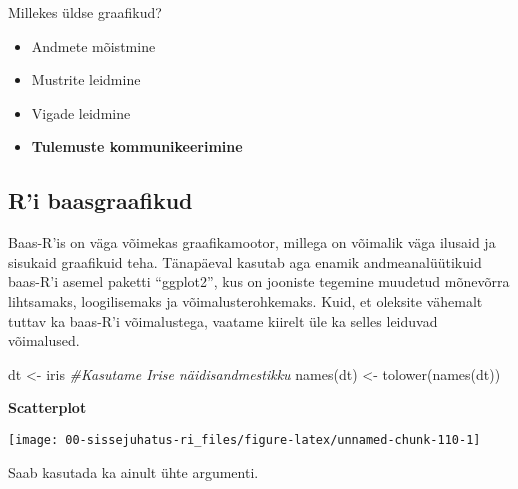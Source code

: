 \documentclass[
]{book}
\newenvironment{Shaded}{\begin{snugshade}}{\end{snugshade}}
\newcommand{\AttributeTok}[1]{\textcolor[rgb]{0.77,0.63,0.00}{#1}}
\newcommand{\CommentTok}[1]{\textcolor[rgb]{0.56,0.35,0.01}{\textit{#1}}}
\newcommand{\FunctionTok}[1]{\textcolor[rgb]{0.00,0.00,0.00}{#1}}
\newcommand{\NormalTok}[1]{#1}
\newcommand{\OtherTok}[1]{\textcolor[rgb]{0.56,0.35,0.01}{#1}}
\newcommand{\SpecialCharTok}[1]{\textcolor[rgb]{0.00,0.00,0.00}{#1}}
\providecommand{\tightlist}{%
  \setlength{\itemsep}{0pt}\setlength{\parskip}{0pt}}
\begin{document}
Millekes üldse graafikud?

\begin{itemize}
\tightlist
\item
  Andmete mõistmine
\item
  Mustrite leidmine
\item
  Vigade leidmine
\item
  \textbf{Tulemuste kommunikeerimine}
\end{itemize}

\hypertarget{ri-baasgraafikud}{%
\subsection{R'i baasgraafikud}\label{ri-baasgraafikud}}

Baas-R'is on väga võimekas graafikamootor, millega on võimalik väga ilusaid ja sisukaid graafikuid teha. Tänapäeval kasutab aga enamik andmeanalüütikuid baas-R'i asemel paketti ``ggplot2'', kus on jooniste tegemine muudetud mõnevõrra lihtsamaks, loogilisemaks ja võimalusterohkemaks. Kuid, et oleksite vähemalt tuttav ka baas-R'i võimalustega, vaatame kiirelt üle ka selles leiduvad võimalused.

\begin{Shaded}
\begin{Highlighting}[]
\NormalTok{dt }\OtherTok{\textless{}{-}}\NormalTok{ iris }\CommentTok{\#Kasutame Iris\textquotesingle{}e näidisandmestikku}
\FunctionTok{names}\NormalTok{(dt) }\OtherTok{\textless{}{-}} \FunctionTok{tolower}\NormalTok{(}\FunctionTok{names}\NormalTok{(dt))}
\end{Highlighting}
\end{Shaded}

\textbf{Scatterplot}

\begin{Shaded}
\end{Shaded}

\begin{center}\texttt{[image: 00-sissejuhatus-ri\_files/figure-latex/unnamed-chunk-110-1]} \end{center}

Saab kasutada ka ainult ühte argumenti.

\begin{Shaded}
\end{Shaded}
\end{document}
